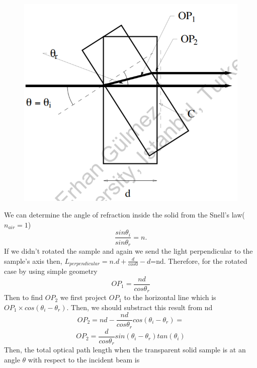 \documentclass[11pt,a4paper]{article}
\begin{document}
{\begin{figure}[H]
\begin{center}
				\includegraphics[scale=0.6]{n.png}
			\end{center}
		\end{figure}
	    We can determine the angle of refraction inside the solid from the Snell's law($n_{air}=1$)
	    \begin{equation}
	    \frac{sin\theta_i}{sin\theta_r}=n.
	    \end{equation}
	    If we didn't rotated the sample and again we send the light perpendicular to the sample's axis then, $L_{perpendicular}=n.d+\frac{d}{cos0}-d$=nd. Therefore, for the rotated case by using simple geometry 
	    \begin{equation}
	    OP_1=\frac{nd}{cos\theta_r}
	    \end{equation}
	    Then to find $OP_2$ we first project $OP_1$ to the horizontal line which is $OP_1\times cos(\theta_i-\theta_r)$. Then, we should substract this result from nd
	    \begin{equation}
	    OP_2=nd-\frac {nd}{cos\theta_r}cos(\theta_i-\theta_r)=
	    \end{equation}
	    \begin{equation}
	    OP_2=\frac{d}{cos\theta_r}sin(\theta_i-\theta_r)tan(\theta_i)
	    \end{equation}
	    Then, the total optical path length when the transparent solid sample is at an angle $\theta$ with respect to the incident beam is
	    \begin{equation}

\end{equation}}
\end{document}
